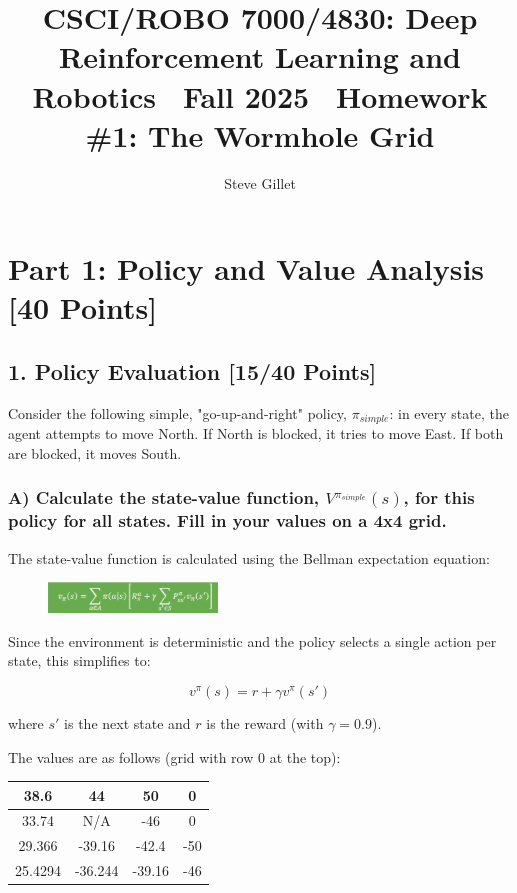 \documentclass{article}
\title{CSCI/ROBO 7000/4830: Deep Reinforcement Learning and Robotics \ Fall 2025 \ Homework \#1: The Wormhole Grid}
\author{Steve Gillet}
\begin{document}
\maketitle
\section*{Part 1: Policy and Value Analysis [40 Points]}

\subsection*{1. Policy Evaluation [15/40 Points]}

Consider the following simple, "go-up-and-right" policy, $\pi_{simple}$: in every state, the agent attempts to move North. If North is blocked, it tries to move East. If both are blocked, it moves South.

\subsubsection*{A) Calculate the state-value function, $V^{\pi_{simple}}(s)$, for this policy for all states. Fill in your values on a 4x4 grid.}

The state-value function is calculated using the Bellman expectation equation:

\begin{figure}[H]
    \centering
    \includegraphics[width=0.4\textwidth]{bellmanExpectation.png}
\end{figure}

Since the environment is deterministic and the policy selects a single action per state, this simplifies to:

\[
v^\pi(s) = r + \gamma v^\pi(s')
\]

where $s'$ is the next state and $r$ is the reward (with $\gamma = 0.9$).

The values are as follows (grid with row 0 at the top):

\begin{center}
\begin{tabular}{|c|c|c|c|}
\hline
38.6 & 44 & 50 & 0 \\
\hline
33.74 & N/A & -46 & 0 \\
\hline
29.366 & -39.16 & -42.4 & -50 \\
\hline
25.4294 & -36.244 & -39.16 & -46 \\
\hline
\end{tabular}
\end{center}
\end{document}
